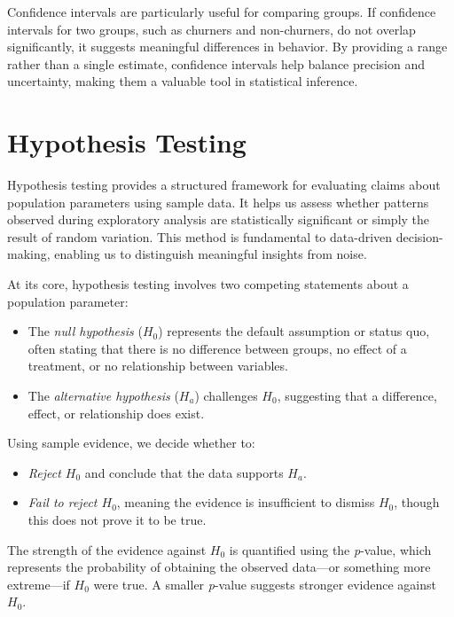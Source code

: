 \documentclass[
  11pt,
]{book}
\providecommand{\tightlist}{%
  \setlength{\itemsep}{0pt}\setlength{\parskip}{0pt}}
\theoremstyle{definition}
\theoremstyle{definition}
\theoremstyle{definition}
\theoremstyle{definition}
\theoremstyle{remark}
\begin{document}
Confidence intervals are particularly useful for comparing groups. If confidence intervals for two groups, such as churners and non-churners, do not overlap significantly, it suggests meaningful differences in behavior. By providing a range rather than a single estimate, confidence intervals help balance precision and uncertainty, making them a valuable tool in statistical inference.

\section{Hypothesis Testing}\label{hypothesis-testing}

Hypothesis testing provides a structured framework for evaluating claims about population parameters using sample data. It helps us assess whether patterns observed during exploratory analysis are statistically significant or simply the result of random variation. This method is fundamental to data-driven decision-making, enabling us to distinguish meaningful insights from noise.

At its core, hypothesis testing involves two competing statements about a population parameter:

\begin{itemize}
\tightlist
\item
  The \emph{null hypothesis} (\(H_0\)) represents the default assumption or status quo, often stating that there is no difference between groups, no effect of a treatment, or no relationship between variables.\\
\item
  The \emph{alternative hypothesis} (\(H_a\)) challenges \(H_0\), suggesting that a difference, effect, or relationship does exist.
\end{itemize}

Using sample evidence, we decide whether to:

\begin{itemize}
\tightlist
\item
  \emph{Reject \(H_0\)} and conclude that the data supports \(H_a\).\\
\item
  \emph{Fail to reject \(H_0\)}, meaning the evidence is insufficient to dismiss \(H_0\), though this does not prove it to be true.
\end{itemize}

The strength of the evidence against \(H_0\) is quantified using the \emph{p}-value, which represents the probability of obtaining the observed data---or something more extreme---if \(H_0\) were true. A smaller \emph{p}-value suggests stronger evidence against \(H_0\).
\end{document}
